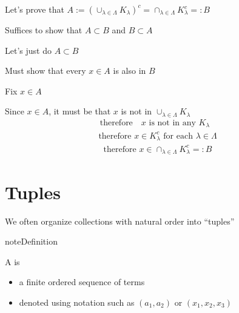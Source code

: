 \documentclass[letterpaper,10pt,english]{jupyterBook}
\begin{document}
\sphinxAtStartPar
Let’s prove that \(A := \left( \cup_{\lambda \in \Lambda} K_{\lambda}  \right)^{c}
= \cap_{\lambda \in \Lambda} K_{\lambda}^{c} =: B\)

\sphinxAtStartPar
Suffices to show that \(A \subset B\) and \(B \subset A\)

\sphinxAtStartPar
Let’s just do  \(A \subset B\)

\sphinxAtStartPar
Must show that every \(x \in A\) is also in \(B\)

\sphinxAtStartPar
Fix \(x \in A\)

\sphinxAtStartPar
Since \(x \in A\), it must be that \(x\) is not in \(\cup_{\lambda \in \Lambda} K_{\lambda}\)
\begin{equation*}
\begin{split}
\text{therefore } \text{ $x$ is not in any $K_{\lambda}$ }
\end{split}
\end{equation*}\begin{equation*}
\begin{split}
\text{therefore } x \in K_{\lambda}^c \text{ for each } \lambda \in \Lambda
\end{split}
\end{equation*}\begin{equation*}
\begin{split}
\text{therefore } x \in \cap_{\lambda \in \Lambda} K_{\lambda}^{c} =: B
\end{split}
\end{equation*}

\section{Tuples}
\label{\detokenize{03.set_theory:tuples}}
\sphinxAtStartPar
We often organize collections with natural order into “tuples”

\begin{sphinxadmonition}{note}{Definition}

\sphinxAtStartPar
A  is
\begin{itemize}
\item {} 
\sphinxAtStartPar
a finite ordered sequence of terms

\item {} 
\sphinxAtStartPar
denoted using notation such as \((a_1, a_2)\) or \((x_1, x_2, x_3)\)

\end{itemize}
\end{sphinxadmonition}
\end{document}
